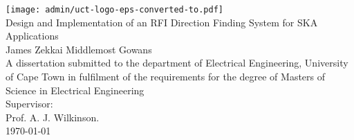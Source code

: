\begin{titlepage}
\begin{center}

\texttt{[image: admin/uct-logo-eps-converted-to.pdf]}\\[1.6cm]

{\LARGE Design and Implementation of an RFI Direction Finding System for SKA Applications}\\[1.6cm]
{\Large James Zekkai Middlemost Gowans}\\[1.6cm]

A dissertation submitted to the department of Electrical Engineering, University of Cape Town in fulfilment of the requirements for the degree of Masters of Science in Electrical Engineering\\[1.6cm]

Supervisor:\\
Prof. A. J. Wilkinson. \\[1cm]

\today

\end{center}
\end{titlepage}

